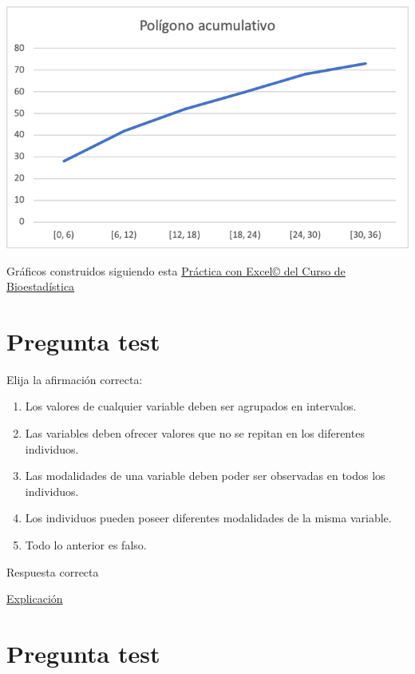 \documentclass[
]{book}
\providecommand{\tightlist}{%
  \setlength{\itemsep}{0pt}\setlength{\parskip}{0pt}}
\begin{document}
\includegraphics[width=10.03in]{img/1_5}

Gráficos construidos siguiendo esta \href{https://1fjmanzano.github.io/bioestadistica/nu\%CC\%81meros-i\%CC\%81ndices.html\#n\%C3\%BAmeros-\%C3\%ADndices-pr\%C3\%A1ctica-con-excel}{Práctica con Excel© del Curso de Bioestadística}

\hypertarget{pregunta-test-20}{%
\section{Pregunta test}\label{pregunta-test-20}}

Elija la afirmación correcta:

\begin{enumerate}
\def\labelenumi{\alph{enumi})}
\tightlist
\item
  Los valores de cualquier variable deben ser agrupados en intervalos.
\item
  Las variables deben ofrecer valores que no se repitan en los diferentes individuos.
\item
  Las modalidades de una variable deben poder ser observadas en todos los individuos.
\item
  Los individuos pueden poseer diferentes modalidades de la misma variable.
\item
  Todo lo anterior es falso.
\end{enumerate}

Respuesta correcta

\href{https://1fjmanzano.github.io/bioestadistica/tipos-de-variables.html}{Explicación}

\hypertarget{pregunta-test-21}{%
\section{Pregunta test}\label{pregunta-test-21}}
\end{document}
